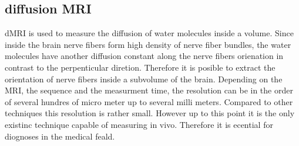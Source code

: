 \subsection{diffusion MRI}
% 
\ac{dMRI} is used to measure the diffusion of water molecules inside a volume.
Since inside the brain nerve fibers form high density of nerve fiber bundles, the water molecules have another diffusion constant along the nerve fibers orienation in contrast to the perpenticular diretion.
Therefore it is posible to extract the orientation of nerve fibers inside a subvolume of the brain.
Depending on the \ac{MRI}, the sequence and the measurment time, the resolution can be in the order of several hundres of micro meter up to several milli meters.
Compared to other techniques this resolution is rather small. 
However up to this point it is the only existinc technique capable of measuring in vivo.
Therefore it is ecential for diognoses in the medical feald.
% 
% 
% 
